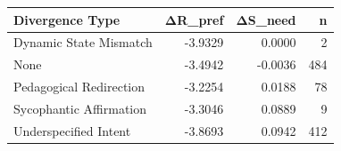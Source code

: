 \begin{tabular}{lrrr}
\toprule
Divergence Type & ΔR_pref & ΔS_need & n \\
\midrule
Dynamic State Mismatch & -3.9329 & 0.0000 & 2 \\
None & -3.4942 & -0.0036 & 484 \\
Pedagogical Redirection & -3.2254 & 0.0188 & 78 \\
Sycophantic Affirmation & -3.3046 & 0.0889 & 9 \\
Underspecified Intent & -3.8693 & 0.0942 & 412 \\
\bottomrule
\end{tabular}
